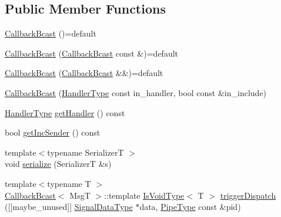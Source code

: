 \subsection*{Public Member Functions}
\begin{DoxyCompactItemize}
\item 
\hyperlink{structvt_1_1pipe_1_1callback_1_1_callback_bcast_adbfcc31e986a2aed709b8517e0e978ae}{Callback\+Bcast} ()=default
\item 
\hyperlink{structvt_1_1pipe_1_1callback_1_1_callback_bcast_a7a711d532fcf9c8c91ab984e9848e2f0}{Callback\+Bcast} (\hyperlink{structvt_1_1pipe_1_1callback_1_1_callback_bcast}{Callback\+Bcast} const \&)=default
\item 
\hyperlink{structvt_1_1pipe_1_1callback_1_1_callback_bcast_af90721bd868d3d3e4140db4bee5da39f}{Callback\+Bcast} (\hyperlink{structvt_1_1pipe_1_1callback_1_1_callback_bcast}{Callback\+Bcast} \&\&)=default
\item 
\hyperlink{structvt_1_1pipe_1_1callback_1_1_callback_bcast_a57451443d73bc8cc4deb3649ec61a776}{Callback\+Bcast} (\hyperlink{namespacevt_af64846b57dfcaf104da3ef6967917573}{Handler\+Type} const in\+\_\+handler, bool const \&in\+\_\+include)
\item 
\hyperlink{namespacevt_af64846b57dfcaf104da3ef6967917573}{Handler\+Type} \hyperlink{structvt_1_1pipe_1_1callback_1_1_callback_bcast_a7585164f2854f2af3f23af0e0468e0c8}{get\+Handler} () const
\item 
bool \hyperlink{structvt_1_1pipe_1_1callback_1_1_callback_bcast_a44fca909dc3216da6c84a6277649fa6e}{get\+Inc\+Sender} () const
\item 
{\footnotesize template$<$typename SerializerT $>$ }\\void \hyperlink{structvt_1_1pipe_1_1callback_1_1_callback_bcast_a2337a0d2bda968f7ab1e4c85c3dbe67a}{serialize} (SerializerT \&s)
\item 
{\footnotesize template$<$typename T $>$ }\\\hyperlink{structvt_1_1pipe_1_1callback_1_1_callback_bcast}{Callback\+Bcast}$<$ MsgT $>$\+::template \hyperlink{structvt_1_1pipe_1_1callback_1_1_callback_bcast_a3ca08c23824cfac76b837311a1d2c929}{Is\+Void\+Type}$<$ T $>$ \hyperlink{structvt_1_1pipe_1_1callback_1_1_callback_bcast_a3f7a3a2894572c6c59be68ca4687bcad}{trigger\+Dispatch} (\mbox{[}\mbox{[}maybe\+\_\+unused\mbox{]}\mbox{]} \hyperlink{structvt_1_1pipe_1_1callback_1_1_callback_bcast_aaf994b71056001334d30d74fa9c958f9}{Signal\+Data\+Type} $\ast$data, \hyperlink{namespacevt_ac9852acda74d1896f48f406cd72c7bd3}{Pipe\+Type} const \&pid)

\end{DoxyCompactItemize}
